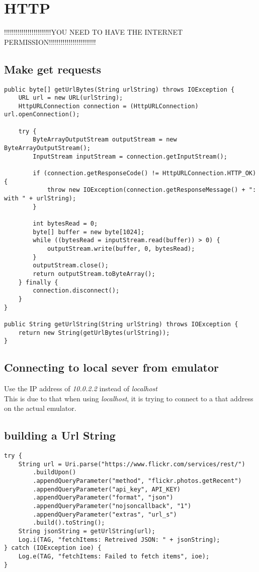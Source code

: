 \documentclass[]{article}
\renewcommand{\it}[1]{\textit{#1}}
\begin{document}
\section{HTTP}
!!!!!!!!!!!!!!!!!!!!!!!!YOU NEED TO HAVE THE INTERNET PERMISSION!!!!!!!!!!!!!!!!!!!!!!!!
\subsection{Make get requests}
\begin{lstlisting}
public byte[] getUrlBytes(String urlString) throws IOException {
	URL url = new URL(urlString);
	HttpURLConnection connection = (HttpURLConnection) url.openConnection();

	try {
		ByteArrayOutputStream outputStream = new ByteArrayOutputStream();
		InputStream inputStream = connection.getInputStream();

		if (connection.getResponseCode() != HttpURLConnection.HTTP_OK) {
			throw new IOException(connection.getResponseMessage() + ": with " + urlString);
		}

		int bytesRead = 0;
		byte[] buffer = new byte[1024];
		while ((bytesRead = inputStream.read(buffer)) > 0) {
			outputStream.write(buffer, 0, bytesRead);
		}
		outputStream.close();
		return outputStream.toByteArray();
	} finally {
		connection.disconnect();
	}
}

public String getUrlString(String urlString) throws IOException {
	return new String(getUrlBytes(urlString));
}
\end{lstlisting}

\subsection{Connecting to local sever from emulator}
Use the IP address of \it{10.0.2.2} instead of \it{localhost} 
\\
This is due to that when using \it{localhost}, it is trying to connect to a that address on the actual emulator. 

\subsection{building a Url String}
\begin{lstlisting}
try {
	String url = Uri.parse("https://www.flickr.com/services/rest/")
		.buildUpon()
		.appendQueryParameter("method", "flickr.photos.getRecent")
		.appendQueryParameter("api_key", API_KEY)
		.appendQueryParameter("format", "json")
		.appendQueryParameter("nojsoncallback", "1")
		.appendQueryParameter("extras", "url_s")
		.build().toString();
	String jsonString = getUrlString(url);
	Log.i(TAG, "fetchItems: Retreived JSON: " + jsonString);
} catch (IOException ioe) {
	Log.e(TAG, "fetchItems: Failed to fetch items", ioe);
}
\end{lstlisting}
\end{document}
